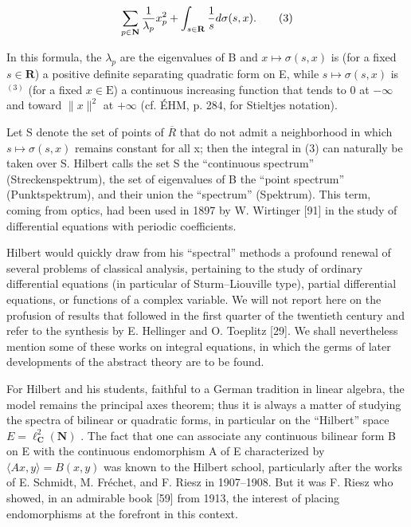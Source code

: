 \[
\sum_ {p \in {\bf N}} \frac {1}{\lambda_ {p}} x _ {p} ^ {2} + \int_ {s \in {\bf R}} \frac {1}{s} d \sigma (s, x).\tag{3}
\]

In this formula, the \(\lambda_{p}\) are the eigenvalues of B and \(x\mapsto\sigma(s,x)\) is (for a fixed \(s\in\mathbf{R}\)) a positive definite separating quadratic form on E, while \(s\mapsto\sigma(s,x)\) is \(^{(3)}\) (for a fixed \(x\in\mathrm{E}\)) a continuous increasing function that tends to 0 at \(-\infty\) and toward \(\|x\|^2\) at \(+\infty\) (cf. ÉHM, p. 284, for Stieltjes notation).

Let S denote the set of points of \(\overline{R}\) that do not admit a neighborhood in which \(s \mapsto \sigma(s, x)\) remains constant for all x; then the integral in (3) can naturally be taken over S. Hilbert calls the set S the “continuous spectrum” (Streckenspektrum), the set of eigenvalues of B the “point spectrum” (Punktspektrum), and their union the “spectrum” (Spektrum). This term, coming from optics, had been used in 1897 by W. Wirtinger [91] in the study of differential equations with periodic coefficients.

Hilbert would quickly draw from his “spectral” methods a profound renewal of several problems of classical analysis, pertaining to the study of ordinary differential equations (in particular of Sturm–Liouville type), partial differential equations, or functions of a complex variable. We will not report here on the profusion of results that followed in the first quarter of the twentieth century and refer to the synthesis by E. Hellinger and O. Toeplitz [29]. We shall nevertheless mention some of these works on integral equations, in which the germs of later developments of the abstract theory are to be found.

For Hilbert and his students, faithful to a German tradition in linear algebra, the model remains the principal axes theorem; thus it is always a matter of studying the spectra of bilinear or quadratic forms, in particular on the “Hilbert” space \(E = \ell_{\mathbf{C}}^{2}(\mathbf{N})\) . The fact that one can associate any continuous bilinear form B on E with the continuous endomorphism A of E characterized by \(\langle Ax, y \rangle = B(x, y)\) was known to the Hilbert school, particularly after the works of E. Schmidt, M. Fréchet, and F. Riesz in 1907–1908. But it was F. Riesz who showed, in an admirable book [59] from 1913, the interest of placing endomorphisms at the forefront in this context.

